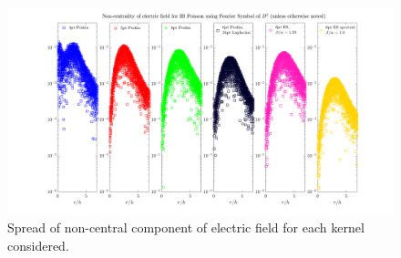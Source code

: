 
\begin{figure}[H]
	\centering
	\includegraphics[width=1\columnwidth]{../Figures/nonC_all_new.png}
	\caption{Spread of non-central component of electric field for each kernel considered.}\label{nonC}
\end{figure}

